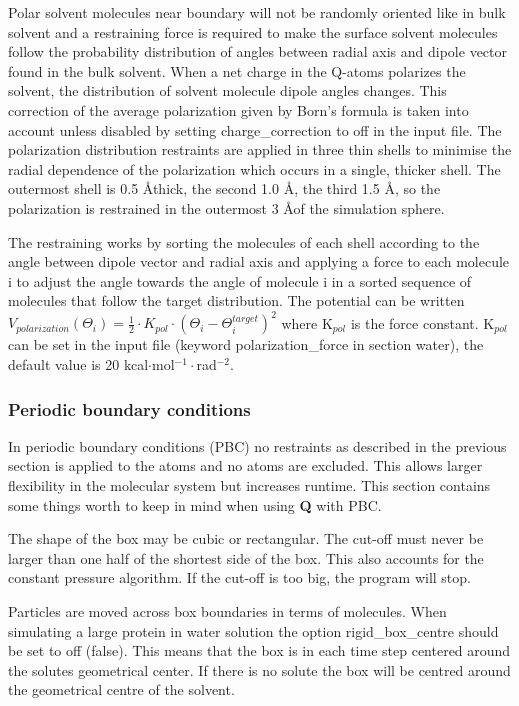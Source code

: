 \documentclass[a4paper,10pt]{article}
\begin{document}
Polar solvent molecules near boundary will not be randomly
oriented like in bulk solvent and a restraining force is required
to make the surface solvent molecules follow the probability
distribution of angles between radial axis and dipole vector found
in the bulk solvent. When a net charge in the Q-atoms polarizes
the solvent, the distribution of solvent molecule dipole angles
changes. This correction of the average polarization given by
Born's formula is taken into account unless disabled by setting
charge\_correction to off in the input file. The polarization
distribution restraints are applied in three thin shells to
minimise the radial dependence of the polarization which occurs in
a single, thicker shell. The outermost shell is 0.5 \AA thick, the
second 1.0 \AA, the third 1.5 \AA, so the polarization is restrained
in the outermost 3 \AA of the simulation sphere.

The restraining works by sorting the molecules of each shell
according to the angle between dipole vector and radial axis and
applying a force to each molecule i to adjust the angle towards
the angle of molecule i in a sorted sequence of molecules that
follow the target distribution. The potential can be written
$V_{polarization} \left(\Theta _i \right) = \frac{1}{2} \cdot
K_{pol} \cdot \left( \Theta _i - \Theta _i^{target} \right)^2$
where K$_{pol}$ is the force constant. K$_{pol}$ can be set in the
input file (keyword polarization\_force in section water), the
default value is 20 kcal$\cdot$mol$^{-1}\cdot$rad$^{-2}$.

\subsubsection{Periodic boundary conditions}
In periodic boundary conditions (PBC) no restraints as described
in the previous section is applied to the atoms and no atoms are
excluded. This allows larger flexibility in the molecular system
but increases runtime. This section contains some things worth to
keep in mind when using \textbf{Q} with PBC.

The shape of the box may be cubic or rectangular. The cut-off must
never be larger than one half of the shortest side of the box.
This also accounts for the constant pressure algorithm. If the
cut-off is too big, the program will stop.

Particles are moved across box boundaries in terms of molecules.
When simulating a large protein in water solution the option
rigid\_box\_centre should be set to off (false). This means that
the box is in each time step centered around the solutes
geometrical center. If there is no solute the box will be centred
around the geometrical centre of the solvent.
\end{document}
